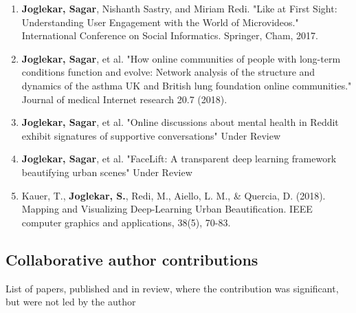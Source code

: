 \begin{enumerate}
    \item \textbf{Joglekar, Sagar}, Nishanth Sastry, and Miriam Redi. "Like at First Sight: Understanding User Engagement with the World of Microvideos." International Conference on Social Informatics. Springer, Cham, 2017.
    
    \item \textbf{Joglekar, Sagar}, et al. "How online communities of people with long-term conditions function and evolve: Network analysis of the structure and dynamics of the asthma UK and British lung foundation online communities." Journal of medical Internet research 20.7 (2018).
    
    \item \textbf{Joglekar, Sagar}, et al. "Online discussions about mental health in Reddit exhibit signatures of supportive conversations" Under Review
    
    \item \textbf{Joglekar, Sagar}, et al. "FaceLift: A transparent deep learning framework beautifying urban scenes" Under Review
    
    \item Kauer, T., \textbf{Joglekar, S.}, Redi, M., Aiello, L. M., \& Quercia, D. (2018). Mapping and Visualizing Deep-Learning Urban Beautification. IEEE computer graphics and applications, 38(5), 70-83.
    
\end{enumerate}

\subsection{Collaborative author contributions}
List of papers, published and in review, where the contribution was significant, but were not led by the author

